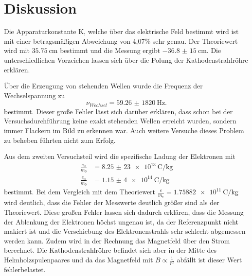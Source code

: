 \section{Diskussion}
\label{sec:Diskussion}
Die Apparaturkonstante K, welche über das elektrische Feld bestimmt wird ist mit einer
betragsmäßigen Abweichung von 4,07\% sehr genau. Der Theoriewert wird mit
$\SI{35,75}{\cm}$ bestimmt und die Messung
ergibt $\SI{-36,8(15)}{\cm}$. Die unterschiedlichen Vorzeichen lassen sich über die
Polung der Kathodenstrahlröhre erklären.

Über die Erzeugung von stehenden Wellen wurde die Frequenz der Wechselspannung
zu
\begin{equation*}
  \nu_{Wechsel}=\SI{59,26(1820)}{\Hz}.
\end{equation*}
bestimmt. Dieser große Fehler lässt sich darüber erklären, dass schon bei der
Versuchsdurchführung keine exakt stehenden Wellen erreicht wurden, sondern immer
Flackern im Bild zu erkennen war. Auch weitere Versuche dieses Problem zu beheben
führten nicht zum Erfolg.

Aus dem zweiten Versuchsteil wird die spezifische Ladung der Elektronen mit
\begin{align*}
  \frac{e_0}{m_0}&=\SI{8,25(23)e+13}{\coulomb\per\kg}\\
  \frac{e_0}{m_0}&=\SI{1,15(4)e+14}{\coulomb\per\kg}
\end{align*}
bestimmt. Bei dem Vergleich mit dem Theoriewert
$\frac{e}{m_e}=\SI{1,75882e11}{\coulomb\per\kg}$ \cite{em}
wird deutlich, dass die Fehler der Messwerte deutlich größer sind als der Theoriewert.
Diese großen Fehler lassen sich dadurch erklären, dass die Messung der Ablenkung der Elektronen
höchst ungenau ist, da der Referenzpunkt nicht makiert ist und die Verschiebung des
Elektronenstrahls sehr schlecht abgemessen werden kann. Zudem wird in der Rechnung das Magnetfeld
über den Strom berechnet. Die Kathodenstrahlröhre befindet sich aber in der Mitte des
Helmholzspulenpaares und da das Magnetfeld mit $B\propto\frac{1}{r^{2}}$ abfällt
ist dieser Wert fehlerbelastet.
